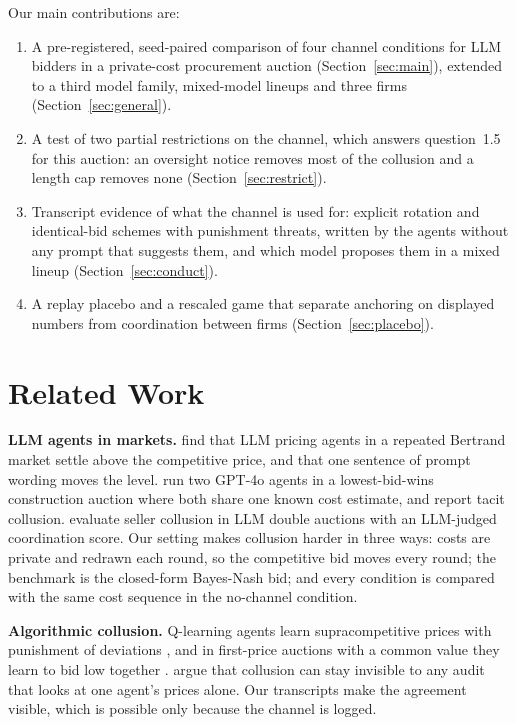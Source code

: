 \documentclass[10pt]{article}
\newcommand{\para}[1]{\textbf{#1}\hspace{0.4em}}
\begin{document}
Our main contributions are:
\begin{enumerate}
\item A pre-registered, seed-paired comparison of four channel conditions for LLM bidders in a private-cost procurement auction (Section~\ref{sec:main}), extended to a third model family, mixed-model lineups and three firms (Section~\ref{sec:general}).
\item A test of two partial restrictions on the channel, which answers question~1.5 for this auction: an oversight notice removes most of the collusion and a length cap removes none (Section~\ref{sec:restrict}).
\item Transcript evidence of what the channel is used for: explicit rotation and identical-bid schemes with punishment threats, written by the agents without any prompt that suggests them, and which model proposes them in a mixed lineup (Section~\ref{sec:conduct}).
\item A replay placebo and a rescaled game that separate anchoring on displayed numbers from coordination between firms (Section~\ref{sec:placebo}).
\end{enumerate}

\section{Related Work}
\label{app:related}

\para{LLM agents in markets.} \citet{fish2024} find that LLM pricing agents in a repeated Bertrand market settle above the competitive price, and that one sentence of prompt wording moves the level. \citet{heo2026} run two GPT-4o agents in a lowest-bid-wins construction auction where both share one known cost estimate, and report tacit collusion. \citet{agrawal2025} evaluate seller collusion in LLM double auctions with an LLM-judged coordination score. Our setting makes collusion harder in three ways: costs are private and redrawn each round, so the competitive bid moves every round; the benchmark is the closed-form Bayes-Nash bid; and every condition is compared with the same cost sequence in the no-channel condition.

\para{Algorithmic collusion.} Q-learning agents learn supracompetitive prices with punishment of deviations \citep{calvano2020}, and in first-price auctions with a common value they learn to bid low together \citep{banchio2022}. \citet{xu2026} argue that collusion can stay invisible to any audit that looks at one agent's prices alone. Our transcripts make the agreement visible, which is possible only because the channel is logged.
\end{document}
